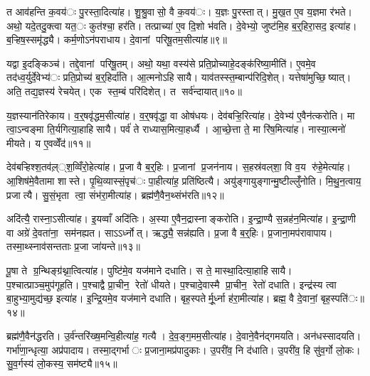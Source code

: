 त आव॑हन्ति क॒वय॑ः पु॒रस्ता॒दित्या॑ह। शु॒श्रु॒वासो॒ वै क॒वय॑ः। य॒ज्ञः पु॒रस्तात्। मु॒ख॒त ए॒व य॒ज्ञमा र॑भते। अथो॒ यदे॒तदु॒क्त्वा यत॒ः कुत॑श्चा॒ हर॑ति। तत्प्राच्या॑ ए॒व दि॒शो भ॑वति। दे॒वेभ्यो॒ जुष्ट॑मि॒ह ब॒र्॒हिरा॒सद॒ इत्या॑ह। ब॒ऱ्हिष॒स्समृ॑द्ध्यै। कर्म॒णोऽन॑पराधाय। दे॒वानां परिषू॒तम॒सीत्या॑ह॥९॥

यद्वा इ॒दङ्किञ्च॑। तद्दे॒वानां परिषू॒तम्। अथो॒ यथा॒ वस्य॑से प्रति॒प्रोच्याहे॒दङ्क॑रिष्या॒मीति॑। ए॒वमे॒व तद॑ध्व॒र्युर्दे॒वेभ्य॑ः प्रति॒प्रोच्य॑ ब॒र्॒हिर्दा॑ति। आ॒त्मनोऽहिसायै। याव॑तस्स्त॒म्बान्प॑रिदि॒शेत्। यत्तेषा॑मुच्छि॒ष्यात्। अति॒ तद्य॒ज्ञस्य॑ रेचयेत्। एक स्त॒म्बं परि॑दिशेत्। त सर्व॑न्दायात्॥१०॥

य॒ज्ञस्यान॑तिरेकाय। व॒र्॒षवृ॑द्धम॒सीत्या॑ह। व॒र्॒षवृ॑द्धा॒ वा ओष॑धयः। देव॑बऱ्हि॒रित्या॑ह। दे॒वेभ्य॑ ए॒वैन॑त्करोति। मा त्वा॒ऽन्वङ्मा ति॒र्यगित्या॒हाहिसायै। पर्व॑ ते राध्यास॒मित्या॒हर्ध्यै। आ॒च्छे॒त्ता ते॒ मा रि॑ष॒मित्या॑ह। नास्या॒त्मनो॑ मीयते। य ए॒वव्वेँद॑॥११॥

देव॑बऱ्हिश्श॒तव॑ल़््श॒व्विँरो॒हेत्या॑ह। प्र॒जा वै ब॒र्॒हिः। प्र॒जानां प्र॒जन॑नाय। स॒हस्र॑वल्‌शा॒ वि व॒य रु॑हे॒मेत्या॑ह। आ॒शिष॑मे॒वैतामा शास्ते। पृ॒थि॒व्यास्सं॒पृच॑ः पा॒हीत्या॑ह॒ प्रति॑ष्ठित्यै। अयु॑ङ्गायुङ्गान्मु॒ष्टील्लुँ॑नोति। मि॒थु॒न॒त्वाय॒ प्रजात्यै। सु॒सं॒भृता त्वा॒ संभ॑रा॒मीत्या॑ह। ब्रह्म॑णै॒वैन॒थ्संभ॑रति॥१२॥

अदि॑त्यै॒ रास्ना॒ऽसीत्या॑ह। इ॒यव्वाँ अदि॑तिः। अ॒स्या ए॒वैन॒द्रास्नाङ्करोति। इ॒न्द्रा॒ण्यै स॒न्नह॑न॒मित्या॑ह। इ॒न्द्रा॒णी वा अग्रे॑ दे॒वता॑ना॒ सम॑नह्यत। साऽऽर्ध्नोत्। ऋद्ध्यै॒ सन्न॑ह्यति। प्र॒जा वै ब॒र्॒हिः। प्र॒जाना॒मप॑रावापाय। तस्मा॒थ्स्नाव॑सन्तताः प्र॒जा जा॑यन्ते॥१३॥

पू॒षा ते ग्र॒न्थिङ्ग्र॑थ्ना॒त्वित्या॑ह। पुष्टि॑मे॒व यज॑माने दधाति। स ते॒ मास्था॒दित्या॒हाहिसायै। प॒श्चात्प्राञ्च॒मुप॑गूहति। प॒श्चाद्वै प्रा॒चीन॒ रेतो॑ धीयते। प॒श्चादे॒वास्मै प्रा॒चीन॒ रेतो॑ दधाति। इन्द्र॑स्य त्वा बा॒हुभ्या॒मुद्य॑च्छ॒ इत्या॑ह। इ॒न्द्रि॒यमे॒व यज॑माने दधाति। बृह॒स्पतेर्मू॒र्ध्ना ह॑रा॒मीत्या॑ह। ब्रह्म॒ वै दे॒वानां॒ बृह॒स्पति॑ः॥१४॥

ब्रह्म॑णै॒वैन॑द्धरति। उ॒र्व॑न्तरि॑ख्ष॒मन्वि॒हीत्या॑ह॒ गत्यै। दे॒व॒ङ्ग॒मम॒सीत्या॑ह। दे॒वाने॒वैन॑द्गमयति। अन॑धस्सादयति। गर्भा॑णा॒न्धृत्या॒ अप्र॑पादाय। तस्मा॒द्गर्भाः प्र॒जाना॒मप्र॑पादुकाः। उ॒परी॑व॒ नि द॑धाति। उ॒परी॑व॒ हि सु॑व॒र्गो लो॒कः। सु॒व॒र्गस्य॑ लो॒कस्य॒ सम॑ष्ट्यै॥१५॥


